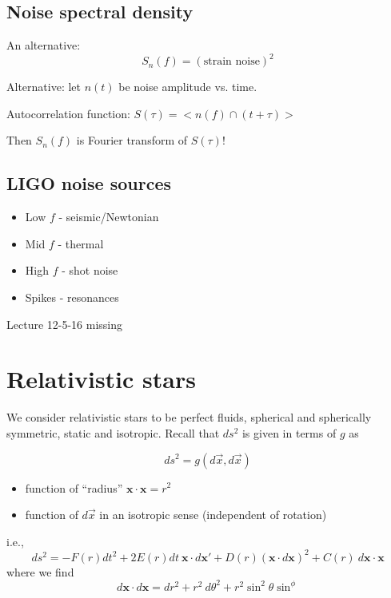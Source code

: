 \documentclass[a4paper]{article} %
\newcommand{\vect}[1]{\mathbf{#1}} %
\begin{document}
\subsection{Noise spectral density}
An alternative:
\begin{equation}
S_n(f)=(\text{strain noise})^2
\end{equation}

Alternative: let $n(t)$ be noise amplitude vs. time.

Autocorrelation function: $S(\tau)=<n(f)\cap (t+\tau)>$

Then $S_n(f)$ is Fourier transform of $S(\tau)$!

\subsection{LIGO noise sources}
\begin{itemize}
\item Low $f$ - seismic/Newtonian
\item Mid $f$ - thermal
\item High $f$ - shot noise
\item Spikes - resonances
\end{itemize}


\HRule

Lecture 12-5-16 missing

\HRule

\section{Relativistic stars}

We consider relativistic stars to be perfect fluids, spherical and spherically symmetric, static and isotropic. Recall that $ds^2$ is given in terms of $g$ as

\begin{equation}
ds^2=g(d\vec{x},d\vec{x})
\end{equation}
\begin{itemize}
\item function of ``radius'' $\vect{x}\cdot \vect{x}=r^2$
\item function of $d\vec{x}$ in an isotropic sense (independent of rotation)
\end{itemize}

i.e.,
\begin{equation}
ds^2 = -F(r)dt^2 + 2E(r)dt~\vect{x}\cdot d\vect{x}'+D(r)(\vect{x}\cdot d\vect{x})^2
+C(r)~d\vect{x}\cdot \vect{x}
\end{equation}
where we find
\begin{equation}
d\vect{x}\cdot d\vect{x}= dr^2+r^2~d\theta^2 + r^2\sin^2\theta \sin^\phi
\end{equation}
\end{document}
